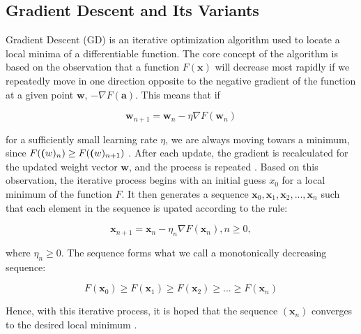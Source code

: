 \documentclass[a4paper, UKenglish, 11pt]{uiomaster}
\begin{document}
\subsection {Gradient Descent and Its Variants}

Gradient Descent (GD) is an iterative optimization algorithm used to locate a local minima of a differentiable function. The core concept of the algorithm is based on the observation that a function $F(\textbf{x})$ will decrease most rapidly if we repeatedly move in one direction opposite to the negative gradient of the function at a given point $\textbf{w}$, $-\nabla F(\textbf{a})$. This means that if

\begin{equation}
\textbf{w}_{n+1} = \textbf{w}_n - \eta\nabla F(\textbf{w}_n)
\end{equation}

for a sufficiently small learning rate $\eta$, we are always moving towars a minimum, since $F(\textbf(w)_n) \ge F(\textbf(w)_{n+1})$ \cite{wiki-gradient-descent}. After each update, the gradient is recalculated for the updated weight vector $\textbf{w}$, and the process is repeated \cite{bishop2006pattern}. Based on this observation, the iterative process begins with an initial guess $x_0$ for a local minimum of the function $F$. It then generates a sequence $\textbf{x}_0, \textbf{x}_1, \textbf{x}_2, ..., \textbf{x}_n$ such that each element in the sequence is upated according to the rule:

\begin{equation}
\textbf{x}_{n+1} = \textbf{x}_{n} - \eta_n\nabla F(\textbf{x}_n), n \ge 0,
\end{equation}

where $\eta_n \ge 0$. The sequence forms what we call a monotonically decreasing sequence:

\begin{equation}
F(\textbf{x}_0) \ge F(\textbf{x}_1) \ge F(\textbf{x}_2) \ge ... \ge F(\textbf{x}_n)
\end{equation}

Hence, with this iterative process, it is hoped that the sequence $(\textbf{x}_n)$ converges to the desired local minimum \cite{wiki-gradient-descent}.
\end{document}
